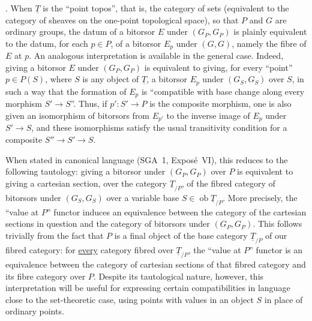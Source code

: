 . When $\underline T$ is the ``point topos'', that is, the
category of sets (equivalent to the category of sheaves on the one-point
topological space), so that $P$ and $G$ are ordinary groups, the datum of
a bitorsor $E$ under $(G_P,G_P)$ is plainly equivalent to the datum, for
each $p\in P$, of a bitorsor $E_p$ under $(G,G)$, namely the fibre of $E$
at $p$. An analogous interpretation is available in the general case.
Indeed, giving a bitorsor $E$ under $(G_P,G_P)$ is equivalent to giving,
for every ``point'' $p\in P(S)$, where $S$ is any object of
$\underline T$, a bitorsor $E_p$ under $(G_S,G_S)$ over $S$, in such a
way that the formation of $E_p$ is ``compatible with base change along
every morphism $S'\longrightarrow S$''. Thus, if
$p':S'\longrightarrow P$ is the composite morphism, one is also given an
isomorphism of bitorsors from $E_{p'}$ to the inverse image of $E_p$ under
$S'\longrightarrow S$, and these isomorphisms satisfy the usual
transitivity condition for a composite
$S''\longrightarrow S'\longrightarrow S$.


When stated in canonical language (SGA~1, Expos\'e~VI), this reduces to
the following tautology: giving a bitorsor under $(G_P,G_P)$ over $P$ is
equivalent to giving a cartesian section, over the category
$\underline T_{/P}$, of the fibred category of bitorsors under
$(G_S,G_S)$ over a variable base $S\in\operatorname{ob}\underline
T_{/P}$. More precisely, the ``value at $P$'' functor induces an
equivalence between the category of the cartesian sections in question
and the category of bitorsors under $(G_P,G_P)$. This follows trivially
from the fact that $P$ is a final object of the base category
$\underline T_{/P}$ of our fibred category: for \underline{every}
category fibred over $\underline T_{/P}$, the ``value at $P$'' functor is
an equivalence between the category of cartesian sections of that fibred
category and its fibre category over $P$. Despite its tautological
nature, however, this interpretation will be useful for expressing
certain compatibilities in language close to the set-theoretic case,
using points with values in an object $S$ in place of ordinary points.

